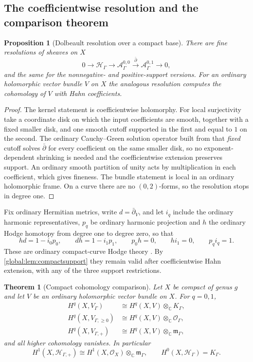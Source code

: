 \documentclass[11pt,letterpaper]{article}
\newtheorem{theorem}{Theorem}[section]
\newtheorem{proposition}[proposition]{Proposition}
\theoremstyle{definition}
\theoremstyle{remark}
\newcommand{\C}{\mathbb C}
\newcommand{\OO}{\mathcal O}
\newcommand{\HH}{\mathscr H_\Gamma}
\newcommand{\HP}{\mathscr H_{\Gamma,+}}
\newcommand{\KK}{K_\Gamma}
\newcommand{\mK}{\mathfrak m_\Gamma}
\numberwithin{equation}{section}
\begin{document}
\subsection{The coefficientwise resolution and the comparison theorem}

\begin{proposition}[Dolbeault resolution over a compact base]\label{global:prop:dolbeault}
There are fine resolutions of sheaves on $X$
\[
  0\longrightarrow\HH\longrightarrow\mathscr A^{0,0}_\Gamma
   \xrightarrow{\ \bar\partial\ }\mathscr A^{0,1}_\Gamma\longrightarrow0,
\]
and the same for the nonnegative- and positive-support versions. For an ordinary holomorphic vector bundle $V$ on $X$ the analogous resolution computes the cohomology of $V$ with Hahn coefficients.
\end{proposition}

\begin{proof}
The kernel statement is coefficientwise holomorphy. For local surjectivity take a coordinate disk on which the input coefficients are smooth, together with a fixed smaller disk, and one smooth cutoff supported in the first and equal to $1$ on the second. The ordinary Cauchy--Green solution operator built from that \emph{fixed} cutoff solves $\bar\partial$ for every coefficient on the same smaller disk, so no exponent-dependent shrinking is needed and the coefficientwise extension preserves support. An ordinary smooth partition of unity acts by multiplication in each coefficient, which gives fineness. The bundle statement is local in an ordinary holomorphic frame. On a curve there are no $(0,2)$-forms, so the resolution stops in degree one.
\end{proof}

Fix ordinary Hermitian metrics, write $d=\bar\partial_V$, and let $i_q$ include the ordinary harmonic representatives, $p_q$ be ordinary harmonic projection and $h$ the ordinary Hodge homotopy from degree one to degree zero, so that
\begin{equation}\label{global:eq:hodge}
  hd=1-i_0p_0,\qquad dh=1-i_1p_1,\qquad
  p_0h=0,\qquad hi_1=0,\qquad p_qi_q=1 .
\end{equation}
These are ordinary compact-curve Hodge theory \cite{Narasimhan}. By \cref{global:lem:compactsupport} they remain valid after coefficientwise Hahn extension, with any of the three support restrictions.

\begin{theorem}[Compact cohomology comparison]\label{global:thm:comparison}
Let $X$ be compact of genus $g$ and let $V$ be an ordinary holomorphic vector bundle on $X$. For $q=0,1$,
\begin{align}
  H^q(X,V_\Gamma)&\cong H^q(X,V)\otimes_\C\KK,\label{global:eq:compareK}\\
  H^q(X,V_{\Gamma,\ge0})&\cong H^q(X,V)\otimes_\C\OO_\Gamma,\label{global:eq:compareR}\\
  H^q(X,V_{\Gamma,+})&\cong H^q(X,V)\otimes_\C\mK,\label{global:eq:comparem}
\end{align}
and all higher cohomology vanishes. In particular
\[
  H^1(X,\HP)\cong H^1(X,\OO_X)\otimes_\C\mK,
  \qquad H^0(X,\HH)=\KK .
\]
\end{theorem}
\end{document}
